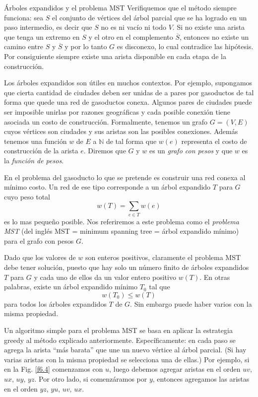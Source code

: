 \begin{section}{Árboles expandidos y el problema MST}
Verifiquemos que el método siempre funciona: sea $S$ el conjunto de vértices del árbol parcial que se ha logrado en un paso intermedio, es decir que $S$ no es ni vacío ni todo $V$. Si no existe una arista que tenga un extremo en $S$ y el otro en el complemento $\overline{S}$, entonces no existe un camino entre $S$ y $\overline{S}$ y por lo tanto $G$ es disconexo, lo cual contradice las hipótesis. Por consiguiente siempre existe una arista disponible en cada etapa de la construcción.

Los árboles expandidos son útiles en muchos contextos. Por ejemplo, su\-pon\-ga\-mos que cierta cantidad de ciudades deben ser unidas de a pares por gasoductos de tal forma que quede una red de gasoductos conexa. Algunos pares de ciudades puede ser imposible unirlas por razones geográficas y cada posible conexión tiene asociada un costo de construcción. Formalmente, tenemos un grafo $G=(V,E)$ cuyos vértices son ciudades y sus aristas son las posibles conexiones. Además te\-ne\-mos una función $w$ de $E$ a $\mathbb N$ de tal forma que $w(e)$ representa el costo de cons\-truc\-ción de la arista $e$. Diremos que $G$ y $w$ es un \textit{grafo con pesos} y que $w$ es la \textit{función de pesos}.  

En el problema del gasoducto lo que se pretende es construir una red conexa al mínimo costo. Un red de ese tipo corresponde a un árbol expandido $T$ para $G$ cuyo peso total 
$$
w(T) = \sum_{e \in T} w(e)
$$
es lo mas pequeño posible. Nos referiremos a este problema como el \textit{problema MST }(del inglés MST = minimum spanning tree =    árbol expandido mínimo) para el grafo con pesos $G$.  

Dado que los valores de $w$ son enteros positivos, claramente el problema MST debe tener solución, puesto que hay solo un número finito de árboles expandidos $T$ para $G$ y cada uno de ellos da un valor entero positivo $w(T)$. En otras palabras, existe un árbol expandido mínimo $T_0$ tal que 
$$
w(T_0) \le w(T)
$$
para todos los árboles expandidos $T$ de $G$. Sin embargo puede haber varios con la misma propiedad.

Un algoritmo simple para el problema MST se basa en aplicar la estrategia greedy al método explicado anteriormente. Específicamente: en cada paso se agrega la arista ``más barata'' que une un nuevo vértice al árbol parcial. (Si hay varias aristas con la misma propiedad se selecciona una de ellas.) Por ejemplo,
si en la Fig. \ref{f6.4} comenzamos con $u$, luego debemos agregar aristas en el orden $uv$, $ux$, $uy$, $yz$. Por otro lado, si comenzáramos por $y$, entonces agregamos las aristas en el orden $yz$, $yu$, $uv$, $ux$. 


\end{section}
